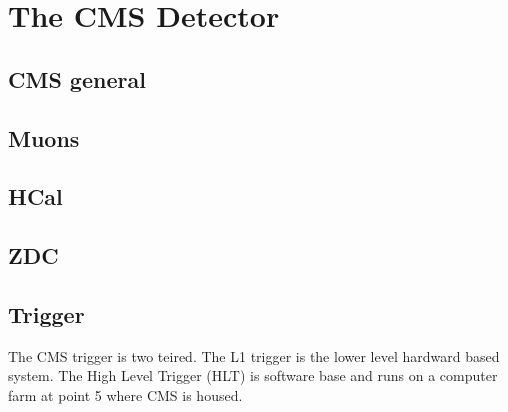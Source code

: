 \chapter{The CMS Detector}	
  \section{CMS general}
  \section{Muons}
  \section{HCal}
  \section{ZDC}
  \section{Trigger}
    The CMS trigger is two teired. 
    The L1 trigger is the lower level hardward based system. 
    The High Level Trigger (HLT) is software base and runs on a computer farm
      at point 5 where CMS is housed. 

